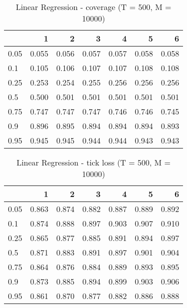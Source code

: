 \documentclass{article}
\begin{document}
\begin{table}[h!]
\centering
\caption{Linear Regression - coverage (T = 500, M = 10000)}
\label{tab: Linear Regression cov}
\begin{tabular}{lrrrrrr}
\toprule
 & 1 & 2 & 3 & 4 & 5 & 6 \\
\midrule
0.05 & 0.055 & 0.056 & 0.057 & 0.057 & 0.058 & 0.058 \\
0.1 & 0.105 & 0.106 & 0.107 & 0.107 & 0.108 & 0.108 \\
0.25 & 0.253 & 0.254 & 0.255 & 0.256 & 0.256 & 0.256 \\
0.5 & 0.500 & 0.501 & 0.501 & 0.501 & 0.501 & 0.501 \\
0.75 & 0.747 & 0.747 & 0.747 & 0.746 & 0.746 & 0.745 \\
0.9 & 0.896 & 0.895 & 0.894 & 0.894 & 0.894 & 0.893 \\
0.95 & 0.945 & 0.945 & 0.944 & 0.944 & 0.943 & 0.943 \\
\bottomrule
\end{tabular}
\end{table}

\begin{table}[h!]
\centering
\caption{Linear Regression - tick loss (T = 500, M = 10000)}
\label{tab: Linear Regression tic}
\begin{tabular}{lrrrrrr}
\toprule
 & 1 & 2 & 3 & 4 & 5 & 6 \\
\midrule
0.05 & 0.863 & 0.874 & 0.882 & 0.887 & 0.889 & 0.892 \\
0.1 & 0.874 & 0.888 & 0.897 & 0.903 & 0.907 & 0.910 \\
0.25 & 0.865 & 0.877 & 0.885 & 0.891 & 0.894 & 0.897 \\
0.5 & 0.871 & 0.883 & 0.891 & 0.897 & 0.901 & 0.904 \\
0.75 & 0.864 & 0.876 & 0.884 & 0.889 & 0.893 & 0.895 \\
0.9 & 0.873 & 0.885 & 0.894 & 0.899 & 0.903 & 0.906 \\
0.95 & 0.861 & 0.870 & 0.877 & 0.882 & 0.886 & 0.888 \\
\bottomrule
\end{tabular}
\end{table}
\end{document}
